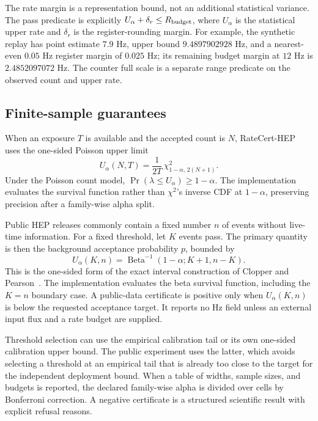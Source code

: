 \documentclass[submission, Phys]{SciPost}
\begin{document}
The rate margin is a representation bound, not an additional statistical
variance.  The pass predicate is explicitly
$U_\alpha+\delta_r\le R_{\rm budget}$, where $U_\alpha$ is the statistical
upper rate and $\delta_r$ is the register-rounding margin.  For example, the
synthetic replay has point estimate $7.9$ Hz, upper bound $9.4897902928$ Hz,
and a nearest-even $0.05$ Hz register margin of $0.025$ Hz; its remaining
budget margin at $12$ Hz is $2.4852097072$ Hz.  The counter full scale is a
separate range predicate on the observed count and upper rate.

\subsection{Finite-sample guarantees}

When an exposure $T$ is available and the accepted count is $N$, RateCert-HEP
uses the one-sided Poisson upper limit
\begin{equation}
 U_\alpha(N,T)=\frac{1}{2T}\,\chi^2_{1-\alpha,\,2(N+1)}.
 \label{eq:poisson}
\end{equation}
Under the Poisson count model, $\Pr(\lambda\le U_\alpha)\ge1-\alpha$.
The implementation evaluates the survival function rather than
$\chi^2$'s inverse CDF at $1-\alpha$, preserving precision after a
family-wise alpha split.

Public HEP releases commonly contain a fixed number $n$ of events without
live-time information.  For a fixed threshold, let $K$ events pass.  The
primary quantity is then the background acceptance probability $p$, bounded by
\begin{equation}
 U_\alpha(K,n)=\operatorname{Beta}^{-1}(1-\alpha;K+1,n-K).
 \label{eq:binomial}
\end{equation}
This is the one-sided form of the exact interval construction of
Clopper and Pearson~\cite{Clopper1934}.
The implementation evaluates the beta survival function, including the
$K=n$ boundary case.  A public-data certificate is positive only when
$U_\alpha(K,n)$ is below the requested acceptance target.  It reports no Hz
field unless an external input flux and a rate budget are supplied.

Threshold selection can use the empirical calibration tail or its own
one-sided calibration upper bound.  The public experiment uses the latter,
which avoids selecting a threshold at an empirical tail that is already too
close to the target for the independent deployment bound.  When a table of
widths, sample sizes, and budgets is reported, the declared family-wise alpha is
divided over cells by Bonferroni correction.  A negative certificate is a
structured scientific result with explicit refusal reasons.
\end{document}
